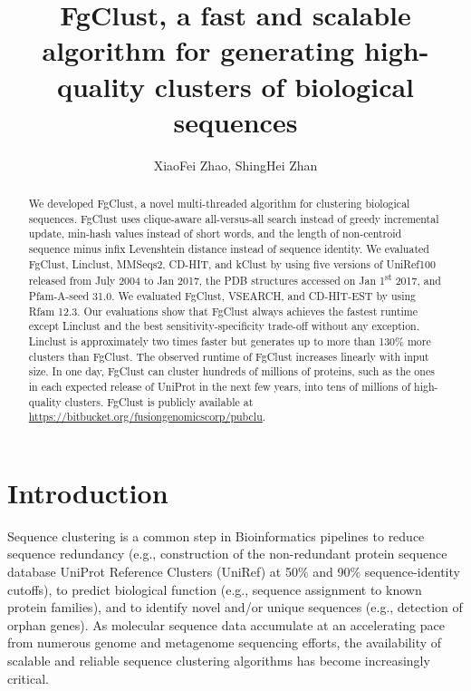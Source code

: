 \documentclass[11pt,letterpaper]{article}
\title{FgClust, a fast and scalable algorithm for generating high-quality clusters of biological sequences}
\author{XiaoFei Zhao, ShingHei Zhan}
\begin{document}
\maketitle

\begin{abstract}
We developed FgClust, a novel multi-threaded algorithm for clustering biological sequences.
FgClust uses clique-aware all-versus-all search instead of greedy incremental update, min-hash values instead of short words, and the length of non-centroid sequence minus infix Levenshtein distance instead of sequence identity.
We evaluated FgClust, Linclust, MMSeqs2, CD-HIT, and kClust by using
five versions of UniRef100 released from July 2004 to Jan 2017, 
the PDB structures accessed on Jan 1\textsuperscript{st} 2017, and Pfam-A-seed 31.0.
We evaluated FgClust, VSEARCH, and CD-HIT-EST by using Rfam 12.3.
Our evaluations show that FgClust always achieves the fastest runtime except Linclust and the best sensitivity-specificity trade-off without any exception.
Linclust is approximately two times faster but generates up to more than 130\% more clusters than FgClust.
The observed runtime of FgClust increases linearly with input size.
In one day, FgClust can cluster hundreds of millions of proteins, such as the ones in each expected release of UniProt in the next few years, into tens of millions of high-quality clusters.
FgClust is publicly available at \url{https://bitbucket.org/fusiongenomicscorp/pubclu}.
\end{abstract}

\section{Introduction}

Sequence clustering is a common step in Bioinformatics pipelines to reduce sequence redundancy (e.g., construction of the non-redundant protein sequence database UniProt Reference Clusters (UniRef) at 50\% and 90\% sequence-identity cutoffs), to predict biological function (e.g., sequence assignment to known protein families), and to identify novel and/or unique sequences (e.g., detection of orphan genes). As molecular sequence data accumulate at an accelerating pace from numerous genome and metagenome sequencing efforts, the availability of scalable and reliable sequence clustering algorithms has become increasingly critical.

\end{document}
